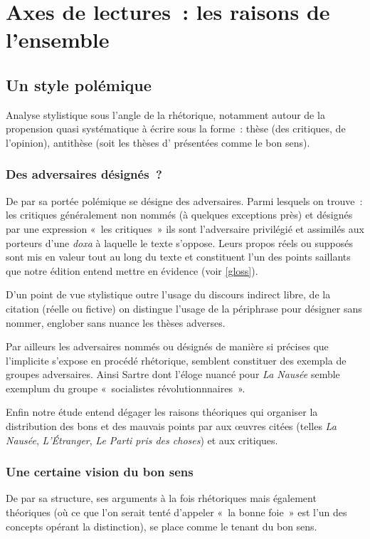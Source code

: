 \documentclass[12pt, a4paper]{article}
\begin{document}
\section{Axes de lectures~: les raisons de l'ensemble}


\subsection{Un style polémique}
Analyse stylistique sous l'angle de la rhétorique, notamment autour de la propension quasi systématique à écrire sous la forme~: thèse (des critiques, de l'opinion), antithèse (soit les thèses d'\robbe{} présentées comme le bon sens). 
    \subsubsection{Des adversaires désignés~?}
    De par sa portée polémique \punr{} se désigne des adversaires. Parmi lesquels on trouve~: les critiques généralement non nommés (à quelques exceptions près) et désignés par une expression «~les critiques~» ils sont l'adversaire privilégié et assimilés aux porteurs d'une \textit{doxa} à laquelle le texte s'oppose. Leurs propos réels ou supposés sont mis en valeur tout au long du texte et constituent l'un des points saillants que notre édition entend mettre en évidence (voir \ref{gloss}).
    
    D'un point de vue stylistique outre l'usage du discours indirect libre, de la citation (réelle ou fictive) on distingue l'usage de la périphrase pour désigner sans nommer, englober sans nuance les thèses adverses.

    Par ailleurs les adversaires nommés ou désignés de manière si précises que l'implicite s'expose en procédé rhétorique, semblent constituer des exempla de groupes adversaires. Ainsi Sartre dont l'éloge nuancé pour \textit{La Nausée} semble exemplum du groupe «~socialistes révolutionnnaires~».

    Enfin notre étude entend dégager les raisons théoriques qui organiser la distribution des bons et des mauvais points par \robbe{} aux œuvres citées (telles \textit{La Nausée}, \textit{L'Étranger}, \textit{Le Parti pris des choses})  et aux critiques.
    \subsubsection{Une certaine vision du bon sens}
    De par sa structure, ses arguments à la fois rhétoriques mais également théoriques (où ce que l'on serait tenté d'appeler «~la bonne foie~» est l'un des concepts opérant la distinction), \robbe{} se place comme le tenant du bon sens.
\end{document}
